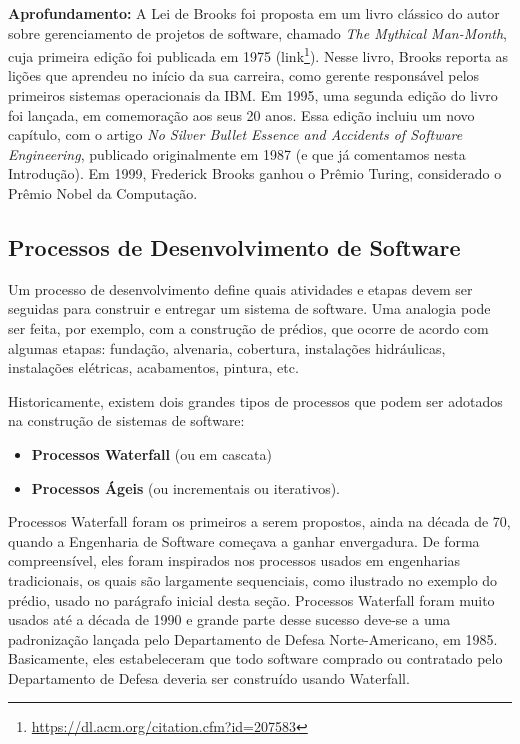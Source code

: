 \documentclass[
  11pt,
  twoside]{book}
\DeclareRobustCommand{\href}[2]{#2\footnote{\url{#1}}}
\newenvironment{esmbox}{\centering \vspace{1.5ex} \begin{tcolorbox}[breakable, colback=backcolor, width=4.9in]}{\end{tcolorbox} \vspace{1.5ex}}
\begin{document}
\begin{esmbox}

\textbf{Aprofundamento:} A Lei de Brooks foi proposta em um livro
clássico do autor sobre gerenciamento de projetos de software, chamado
\emph{The Mythical Man-Month}, cuja primeira edição foi publicada em
1975 (\href{https://dl.acm.org/citation.cfm?id=207583}{link}). Nesse
livro, Brooks reporta as lições que aprendeu no início da sua carreira,
como gerente responsável pelos primeiros sistemas operacionais da IBM.
Em 1995, uma segunda edição do livro foi lançada, em comemoração aos
seus 20 anos. Essa edição incluiu um novo capítulo, com o artigo
\emph{No Silver Bullet Essence and Accidents of Software Engineering},
publicado originalmente em 1987 (e que já comentamos nesta Introdução).
Em 1999, Frederick Brooks ganhou o Prêmio Turing, considerado o Prêmio
Nobel da Computação.

\end{esmbox}

\hypertarget{processos-de-desenvolvimento-de-software}{%
\subsection{Processos de Desenvolvimento de
Software}\label{processos-de-desenvolvimento-de-software}}

 Um processo de desenvolvimento define
quais atividades e etapas devem ser seguidas para construir e entregar
um sistema de software. Uma analogia pode ser feita, por exemplo, com a
construção de prédios, que ocorre de acordo com algumas etapas:
fundação, alvenaria, cobertura, instalações hidráulicas, instalações
elétricas, acabamentos, pintura, etc.

Historicamente, existem dois grandes tipos de processos que podem ser
adotados na construção de sistemas de software:

\begin{itemize}
\item
  \textbf{Processos Waterfall} (ou em cascata)
\item
  \textbf{Processos Ágeis} (ou incrementais ou iterativos).
\end{itemize}

 Processos Waterfall foram os primeiros a serem
propostos, ainda na década de 70, quando a Engenharia de Software
começava a ganhar envergadura. De forma compreensível, eles foram
inspirados nos processos usados em engenharias tradicionais, os quais
são largamente sequenciais, como ilustrado no exemplo do prédio, usado
no parágrafo inicial desta seção. Processos Waterfall foram muito usados
até a década de 1990 e grande parte desse sucesso deve-se a uma
padronização lançada pelo Departamento de Defesa Norte-Americano, em
1985. Basicamente, eles estabeleceram que todo software comprado ou
contratado pelo Departamento de Defesa deveria ser construído usando
Waterfall.
\end{document}
